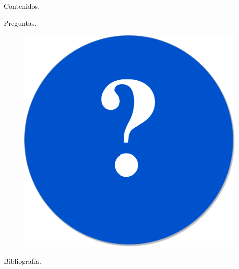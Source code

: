 \documentclass{beamer}
\begin{document}


\begin{frame}[t]{Contenidos}{\textcolor{UniBlue}{.}}
	\tableofcontents
\end{frame}








\begin{frame}{Preguntas}{\textcolor{UniBlue}{.}}
\begin{figure}
  \center
    \includegraphics[scale=0.25]{images/Questions.pdf}
\end{figure}
\end{frame}

\backupbegin
\begin{frame}[allowframebreaks]{Bibliografía}{\textcolor{UniBlue}{.}}
    
    
\end{frame}
\backupend


\end{document}
